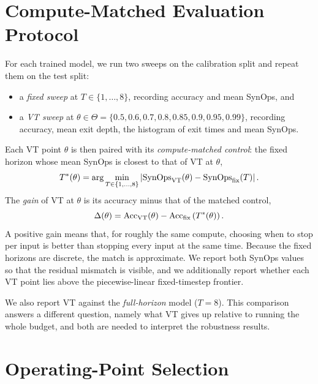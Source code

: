 \section{Compute-Matched Evaluation Protocol}
\label{sec:meth-protocol}

For each trained model, we run two sweeps on the calibration split and repeat them on the test split:

\begin{itemize}
    \item a \emph{fixed sweep} at $T \in \{1, \dots, 8\}$, recording accuracy and mean SynOps, and
    \item a \emph{VT sweep} at $\theta \in \Theta = \{0.5, 0.6, 0.7, 0.8, 0.85, 0.9, 0.95, 0.99\}$, recording accuracy, mean exit depth, the histogram of exit times and mean SynOps.
\end{itemize}

Each VT point $\theta$ is then paired with its \emph{compute-matched control}: the fixed horizon whose mean SynOps is closest to that of VT at $\theta$,
\begin{equation}
    T^{*}(\theta) = \arg\min_{T \in \{1,\dots,8\}} \left| \mathrm{SynOps}_{\mathrm{VT}}(\theta) - \mathrm{SynOps}_{\mathrm{fix}}(T) \right|.
    \label{eq:match}
\end{equation}
The \emph{gain} of VT at $\theta$ is its accuracy minus that of the matched control,
\begin{equation}
    \Delta(\theta) = \mathrm{Acc}_{\mathrm{VT}}(\theta) - \mathrm{Acc}_{\mathrm{fix}}\left(T^{*}(\theta)\right).
    \label{eq:gain}
\end{equation}
A positive gain means that, for roughly the same compute, choosing when to stop per input is better than stopping every input at the same time. Because the fixed horizons are discrete, the match is approximate. We report both SynOps values so that the residual mismatch is visible, and we additionally report whether each VT point lies above the piecewise-linear fixed-timestep frontier.

We also report VT against the \emph{full-horizon} model ($T = 8$). This comparison answers a different question, namely what VT gives up relative to running the whole budget, and both are needed to interpret the robustness results.

\section{Operating-Point Selection}
\label{sec:meth-selection}

